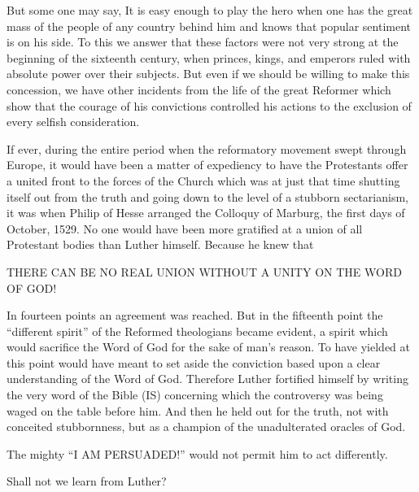 \documentclass[
]{book}
\begin{document}
But some one may say, It is easy enough to play the hero when one has the great mass of the people of any country behind him and knows that popular sentiment is on his side. To this we answer that these factors were not very strong at the beginning of the sixteenth century, when princes, kings, and emperors ruled with absolute power over their subjects. But even if we should be willing to make this concession, we have other incidents from the life of the great Reformer which show that the courage of his convictions controlled his actions to the exclusion of every selfish consideration.

If ever, during the entire period when the reformatory movement swept through Europe, it would have been a matter of expediency to have the Protestants offer a united front to the forces of the Church which was at just that time shutting itself out from the truth and going down to the level of a stubborn sectarianism, it was when Philip of Hesse arranged the Colloquy of Marburg, the first days of October, 1529. No one would have been more gratified at a union of all Protestant bodies than Luther himself. Because he knew that

\begin{center} THERE CAN BE NO REAL UNION WITHOUT A UNITY ON THE WORD OF GOD! \end{center}

In fourteen points an agreement was reached. But in the fifteenth point the ``different spirit'' of the Reformed theologians became evident, a spirit which would sacrifice the Word of God for the sake of man's reason. To have yielded at this point would have meant to set aside the conviction based upon a clear understanding of the Word of God. Therefore Luther fortified himself by writing the very word of the Bible (IS) concerning which the controversy was being waged on the table before him. And then he held out for the truth, not with conceited stubbornness, but as a champion of the unadulterated oracles of God.

The mighty ``I AM PERSUADED!'' would not permit him to act differently.

Shall not we learn from Luther?
\end{document}
